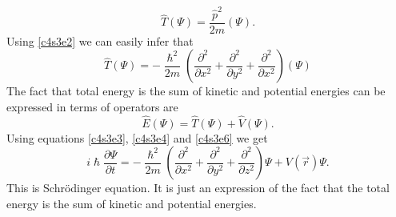 \begin{equation}\label{c4s3e5}
\hat{T}(\Psi) = \frac{\hat{p}^2}{2m}(\Psi).
\end{equation}
Using \eqref{c4s3e2} we can easily infer that
\begin{equation}\label{c4s3e6}
\hat{T}(\Psi) = -\frac{\hslash^2}{2m}\left(\frac{\partial^2}{\partial x^2} 
+ \frac{\partial^2}{\partial y^2} + \frac{\partial^2}{\partial x^2}\right)
(\Psi)
\end{equation}
The fact that total energy is the sum of kinetic and potential energies can be
expressed in terms of operators are
\begin{equation}\label{c4s3e7}
\hat{E}(\Psi) = \hat{T}(\Psi) + \hat{V}(\Psi).
\end{equation}
Using equations \eqref{c4s3e3}, \eqref{c4s3e4} and \eqref{c4s3e6} we get
\begin{equation}\label{c4s3e8}
i\hslash\frac{\partial\Psi}{\partial t} = -\frac{\hslash^2}{2m}
\left(\frac{\partial^2}{\partial x^2} + \frac{\partial^2}{\partial y^2} +
 \frac{\partial^2}{\partial z^2}\right)\Psi + V(\vec{r})\Psi.
\end{equation} 
This is Schr\"{o}dinger equation. It is just an expression of the fact that the
total energy is the sum of kinetic and potential energies.
